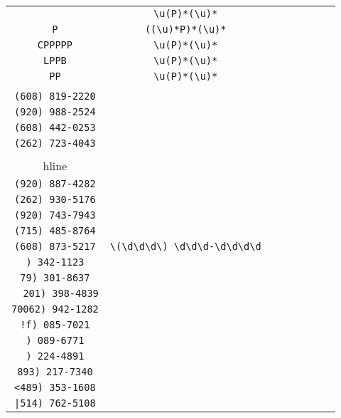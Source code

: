 \begin{longtable}{cccccccc}
\begin{tabular}{ll}
    \verb|SU| & \verb|\u(P)*(\u)*|\\
\verb|P| & \verb|((\u)*P)*(\u)*|\\
\verb|CPPPPP| & \verb|\u(P)*(\u)*|\\
\verb|LPPB| & \verb|\u(P)*(\u)*|\\
\verb|PP| & \verb|\u(P)*(\u)*|
\end{tabular}
\\\midrule 
\begin{tabular}{l}
    \verb|(715) 967-2697|\\
\verb|(608) 819-2220|\\
\verb|(920) 988-2524|\\
\verb|(608) 442-0253|\\
\verb|(262) 723-4043|\\
\\hline\\
\verb|(920) 887-4282|\\
\verb|(262) 930-5176|\\
\verb|(920) 743-7943|\\
\verb|(715) 485-8764|\\
\verb|(608) 873-5217|
\end{tabular}

&
\verb|\(\d\d\d\) \d\d\d-\d\d\d\d|
&

\begin{tabular}{l}
    \verb|(.)*(\d)*\) \d\d\d-\d\d\d\d|\\
\verb|) 342-1123|\\
\verb|79) 301-8637|\\
\verb|	201) 398-4839|\\
\verb|70062) 942-1282|\\
\verb|!f) 085-7021|
\end{tabular}

&

\begin{tabular}{l}
    \verb|(.)*(\d)*\) \d\d\d-\d\d\d\d|\\
\verb|) 089-6771|\\
\verb|) 224-4891|\\
\verb|893) 217-7340|\\
\verb|<489) 353-1608|\\
\verb.|514) 762-5108.
\end{tabular}

&


\end{longtable}
